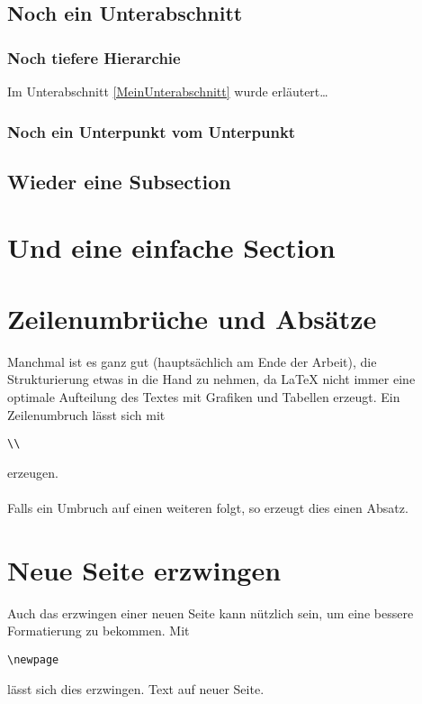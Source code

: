 \subsection{Noch ein Unterabschnitt}
\subsubsection{Noch tiefere Hierarchie}
Im Unterabschnitt \ref{MeinUnterabschnitt} wurde erläutert\ldots
\subsubsection{Noch ein Unterpunkt vom Unterpunkt}
\subsection{Wieder eine Subsection}
\section{Und eine einfache Section}

\section{Zeilenumbrüche und Absätze}

Manchmal ist es ganz gut (hauptsächlich am Ende der Arbeit), die Strukturierung etwas in die Hand zu nehmen,
da LaTeX nicht immer eine optimale Aufteilung des Textes mit Grafiken und Tabellen erzeugt. 
Ein Zeilenumbruch lässt sich mit \begin{verbatim}\\\end{verbatim} erzeugen.\\
\\                                        
Falls ein Umbruch auf einen weiteren folgt, so erzeugt dies einen Absatz.                                      

\section{Neue Seite erzwingen}

Auch das erzwingen einer neuen Seite kann nützlich sein, um eine bessere Formatierung zu bekommen.
Mit \begin{verbatim}\newpage\end{verbatim} lässt sich dies erzwingen.
\newpage
Text auf neuer Seite.